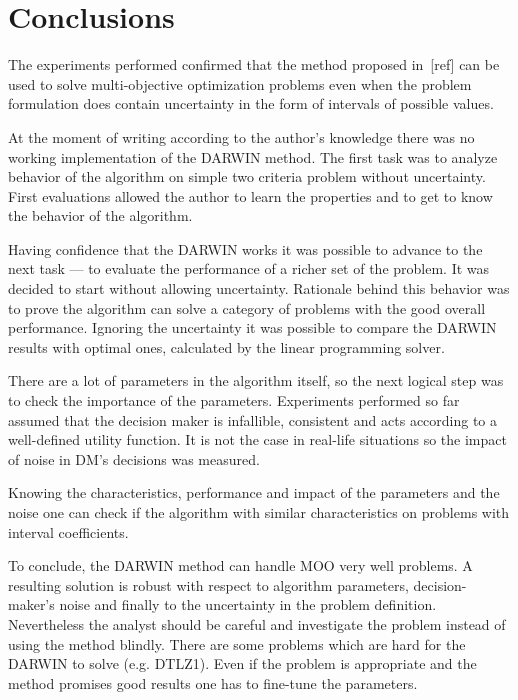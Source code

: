\section{Conclusions}

The experiments performed confirmed that the method proposed in~[ref] can be
used to solve multi-objective optimization problems even when the problem
formulation does contain uncertainty in the form of intervals of possible
values.

At the moment of writing according to the author's knowledge there was no
working implementation of the DARWIN method. The first task was to analyze
behavior of the algorithm on simple two criteria problem without
uncertainty. First evaluations allowed the author to learn the properties and
to get to know the behavior of the algorithm.

Having confidence that the DARWIN works it was possible to advance to the next
task --- to evaluate the performance of a richer set of the problem. It was
decided to start without allowing uncertainty. Rationale behind this behavior
was to prove the algorithm can solve a category of problems with the good
overall performance. Ignoring the uncertainty it was possible to compare the
DARWIN results with optimal ones, calculated by the linear programming solver.

There are a lot of parameters in the algorithm itself, so the next logical
step was to check the importance of the parameters. Experiments performed so
far assumed that the decision maker is infallible, consistent and acts
according to a well-defined utility function. It is not the case in real-life
situations so the impact of noise in DM's decisions was measured.

Knowing the characteristics, performance and impact of the parameters and the
noise one can check if the algorithm with similar characteristics on problems
with interval coefficients.

To conclude, the DARWIN method can handle MOO very well problems. A resulting
solution is robust with respect to algorithm parameters, decision-maker's
noise and finally to the uncertainty in the problem definition. Nevertheless
the analyst should be careful and investigate the problem instead of using the
method blindly. There are some problems which are hard for the DARWIN to solve
(e.g. DTLZ1). Even if the problem is appropriate and the method promises good
results one has to fine-tune the parameters.

